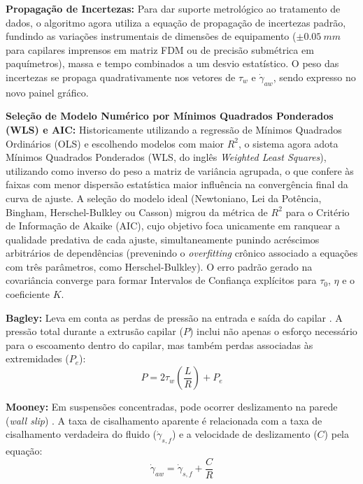 \documentclass[a4paper,12pt]{article}
\begin{document}
\vspace{1em}
\textbf{Propagação de Incertezas:} Para dar suporte metrológico ao tratamento de dados, o algoritmo agora utiliza a equação de propagação de incertezas padrão, fundindo as variações instrumentais de dimensões de equipamento ($\pm \SI{0.05}{mm}$ para capilares imprensos em matriz FDM ou de precisão submétrica em paquímetros), massa e tempo combinados a um desvio estatístico. O peso das incertezas se propaga quadrativamente nos vetores de $\tau_w$ e $\dot{\gamma}_{aw}$, sendo expresso no novo painel gráfico.

\vspace{1em}
\textbf{Seleção de Modelo Numérico por Mínimos Quadrados Ponderados (WLS) e AIC:} 
Historicamente utilizando a regressão de Mínimos Quadrados Ordinários (OLS) e escolhendo modelos com maior $R^2$, o sistema agora adota Mínimos Quadrados Ponderados (WLS, do inglês \textit{Weighted Least Squares}), utilizando como inverso do peso a matriz de variância agrupada, o que confere às faixas com menor dispersão estatística maior influência na convergência final da curva de ajuste. A seleção do modelo ideal (Newtoniano, Lei da Potência, Bingham, Herschel-Bulkley ou Casson) migrou da métrica de $R^2$ para o Critério de Informação de Akaike (AIC), cujo objetivo foca unicamente em ranquear a qualidade predativa de cada ajuste, simultaneamente punindo acréscimos arbitrários de dependências (prevenindo o \textit{overfitting} crônico associado a equações com três parâmetros, como Herschel-Bulkley). O erro padrão gerado na covariância converge para formar Intervalos de Confiança explícitos para $\tau_0$, $\eta$ e o coeficiente $K$.

\vspace{1em}
\textbf{Bagley:} Leva em conta as perdas de pressão na entrada e saída do capilar \cite{barnes1989}. A pressão total durante a extrusão capilar ($P$) inclui não apenas o esforço necessário para o escoamento dentro do capilar, mas também perdas associadas às extremidades ($P_e$):
\begin{equation}
P = 2 \tau_w \left( \frac{L}{R} \right) + P_e
\end{equation}

\textbf{Mooney:} Em suspensões concentradas, pode ocorrer deslizamento na parede (\textit{wall slip}) \cite{barnes1989}. A taxa de cisalhamento aparente é relacionada com a taxa de cisalhamento verdadeira do fluido ($\dot{\gamma}_{s,f}$) e a velocidade de deslizamento ($C$) pela equação:
\begin{equation}
\dot{\gamma}_{aw} = \dot{\gamma}_{s,f} + \frac{C}{R}
\end{equation}
\end{document}
